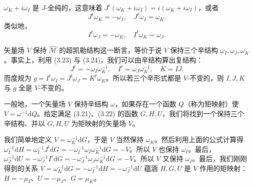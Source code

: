 \documentclass[11pt,a4paper,UTF8]{ctexart}
\theoremstyle{plain}
\theoremstyle{definition}
\begin{document}
$\omega_K+i\omega_I$ 是 $J$-全纯的，这意味着 $J^t(\omega_K+i\omega_I)=i(\omega_K+i\omega_I)$，或者
\begin{equation}
    J^t\omega_K=-\omega_I,\quad J^t\omega_I=\omega_K.
    \tag{3.23}
\end{equation}
类似地，
\begin{equation}
    I^t\omega_J=-\omega_K,\quad I^t\omega_K=\omega_J.
    \tag{3.24}
\end{equation}

矢量场 $V$ 保持 $\widehat{\mathcal{M}}$ 的超凯勒结构这一断言，等价于说 $V$ 保持三个辛结构 $\omega_I,\omega_J,\omega_K$。事实上，利用 (3.23) 与 (3.24)，我们可以由辛结构算出复结构：
\begin{equation}
    J^t=-\omega_I\omega_K^{-1},\quad I^t=\omega_J\omega_K^{-1},\quad K=IJ.
    \tag{3.25}
\end{equation}
而度规为 $g=I^t\omega_I=J^t\omega_J=K^t\omega_K$。所以若三个辛形式都是 $V$-不变的，则 $I,J,K$ 与 $g$ 全是 $V$-不变的。

一般地，一个矢量场 $V$ 保持辛结构 $\omega$，如果存在一个函数 $Q$（称为矩映射）使 $V=\omega^{-1}\mathrm{d}Q$。给定满足 (3.21)、(3.22) 的函数 $G,H,U$，我们将找到一个保持三个辛结构、并以 $G,H,U$ 为矩映射的矢量场 $V$。


我们简单地定义 $V=\omega_K^{-1}\mathrm{d}G$，于是 $V$ 当然保持 $\omega_K$。然后利用上面的公式计算得 $\omega_I^{-1}\mathrm{d}H=\omega_I^{-1}J^t\mathrm{d}G=-\omega_I^{-1}\omega_I\omega_K^{-1}\mathrm{d}G=-V$。所以 $V$ 也保持 $\omega_I$。最后，$\omega_J^{-1}\mathrm{d}U=-\omega_J^{-1}I^t\mathrm{d}G=-\omega_J^{-1}\omega_J\omega_K^{-1}\mathrm{d}G=-V$。所以 $V$ 又保持 $\omega_I$。最后，我们刚刚得到的关系 $V=\omega_K^{-1}\mathrm{d}G=-\omega_I^{-1}\mathrm{d}H=-\omega_J^{-1}\mathrm{d}U$ 蕴涵 $H,G,U$ 是 $V$ 作用的矩映射：$H=-\mu_I$、$U=-\mu_J$、$G=\mu_K$。

\end{document}
